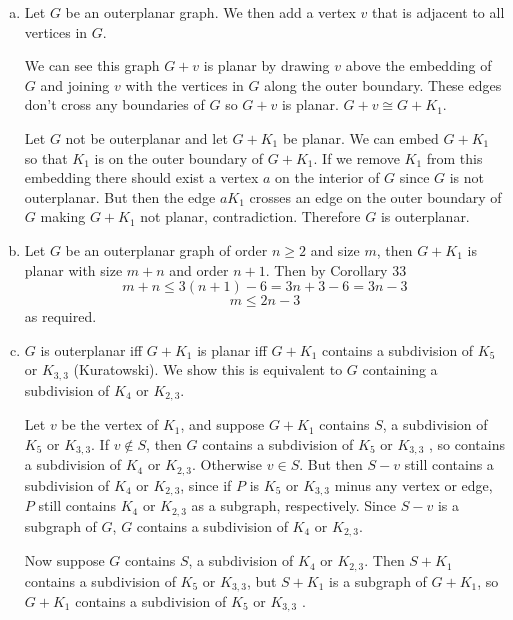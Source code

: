 \begin{enumerate}[(a)]
    \item Let $G$ be an outerplanar graph. We then add a vertex $v$ 
    that is adjacent to all vertices in $G$. 
    
    We can see this graph $G+v$ is planar by drawing $v$
    above the embedding of $G$ and joining $v$ with the vertices in $G$ 
    along the outer boundary. These edges don't cross any boundaries of 
    $G$ so $G+v$ is planar.  $G+v \cong G+K_1$.

    Let $G$ not be outerplanar and let $G+K_1$ be planar. We can embed
    $G+K_1$ so that $K_1$ is on the outer boundary of $G+K_1$.
    If we remove $K_1$ from this embedding there should exist a
    vertex $a$ on the interior of $G$ since $G$ is not outerplanar.
    But then the edge $aK_1$ crosses an edge on the outer boundary
    of $G$ making $G+K_1$ not planar, contradiction. Therefore
    $G$ is outerplanar.

    \item Let $G$ be an outerplanar graph of order $n \ge 2$ and size $m$, 
    then $G+K_1$ is planar with size $m+n$ and order $n+1$. Then
    by Corollary 33 
        $$ m+n \le 3(n+1) - 6 = 3n+3-6 = 3n-3$$
        $$m \le 2n-3$$
        as required.

    \item $G$ is outerplanar iff $G+K_1$ is planar iff $G+K_1$ contains
			a subdivision of
			$K_5$ or $K_{3,3}$ (Kuratowski). We show
			this is equivalent to $G$ containing a subdivision of $K_4$ or $K_{2,3}$.

			Let $v$ be the vertex of $K_1$, and suppose $G+K_1$ contains $S$,
			a subdivision of $K_5$ or $K_{3,3}$. If $v \notin S$, then
			$G$ contains a subdivision of $K_5$ or $K_{3,3}$ , so contains
			a subdivision of $K_4$ or $K_{2,3}$. Otherwise $v \in S$.
			But then $S-v$ still contains a subdivision of $K_4$ or $K_{2,3}$,
			since if $P$ is $K_5$ or $K_{3,3}$ minus any vertex or edge,
			$P$ still contains $K_4$ or $K_{2,3}$ as a subgraph, respectively.
			Since $S-v$ is a subgraph of $G$, $G$ contains a subdivision of 
			$K_4$ or $K_{2,3}$. 

			Now suppose $G$ contains $S$, a subdivision of $K_4$ or $K_{2,3}$.
			Then $S+K_1$ contains a subdivision of $K_5$ or $K_{3,3}$, but
			$S+K_1$ is a subgraph of $G+K_1$, so $G+K_1$ contains a subdivision of 
			$K_5$ or $K_{3,3}$ .
\end{enumerate}
